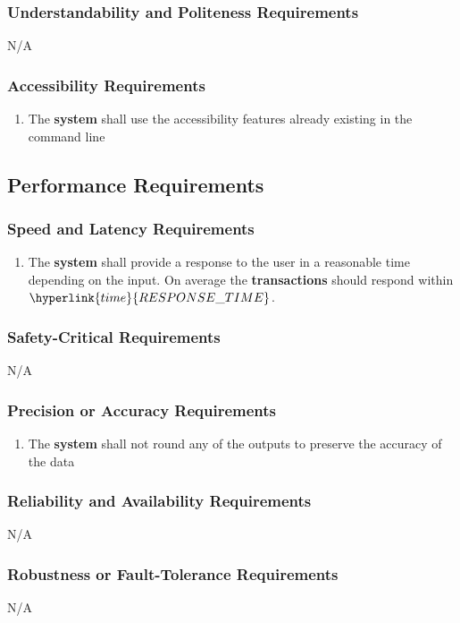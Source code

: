 \documentclass[12pt, titlepage]{article}
\begin{document}
    \subsubsection{Understandability and Politeness Requirements}
        N/A
    \subsubsection{Accessibility Requirements}
        \begin{enumerate}
            \item The \textbf{system} shall use the accessibility features already existing in the command line
        \end{enumerate}
\subsection{Performance Requirements}
    \subsubsection{Speed and Latency Requirements}
        \begin{enumerate}
            \item The \textbf{system} shall provide a response to the user in a reasonable time depending on the input. On average the \textbf{transactions} should respond within $\hyperlink{time}{RESPONSE\_TIME}$.
        \end{enumerate}
    \subsubsection{Safety-Critical Requirements}
        N/A
    \subsubsection{Precision or Accuracy Requirements}
        \begin{enumerate}
            \item The \textbf{system} shall not round any of the outputs to preserve the accuracy of the data
        \end{enumerate}
    \subsubsection{Reliability and Availability Requirements}
        N/A
    \subsubsection{Robustness or Fault-Tolerance Requirements}
        N/A
\end{document}

